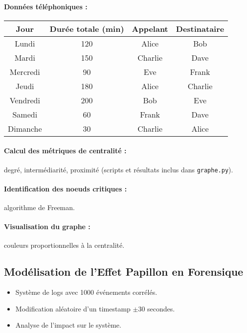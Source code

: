 \documentclass[12pt,a4paper]{article}
\begin{document}
\paragraph{Donn\'ees t\'el\'ephoniques :}
\begin{longtable}{|c|c|c|c|}
\hline
Jour & Dur\'ee totale (min) & Appelant & Destinataire \\
\hline
Lundi & 120 & Alice & Bob \\
Mardi & 150 & Charlie & Dave \\
Mercredi & 90 & Eve & Frank \\
Jeudi & 180 & Alice & Charlie \\
Vendredi & 200 & Bob & Eve \\
Samedi & 60 & Frank & Dave \\
Dimanche & 30 & Charlie & Alice \\
\hline
\end{longtable}

\paragraph{Calcul des m\'etriques de centralit\'e :} degr\'e, interm\'ediarit\'e, proximit\'e (scripts et r\'esultats inclus dans \texttt{graphe.py}).

\paragraph{Identification des noeuds critiques :} algorithme de Freeman.

\paragraph{Visualisation du graphe :} couleurs proportionnelles \`a la centralit\'e.

\subsection*{Mod\'elisation de l'Effet Papillon en Forensique}

\begin{itemize}
    \item Syst\`eme de logs avec 1000 \'ev\'enements corr\'el\'es.
    \item Modification al\'eatoire d'un timestamp $\pm$30 secondes.
    \item Analyse de l'impact sur le syst\`eme.
\end{itemize}
\end{document}
